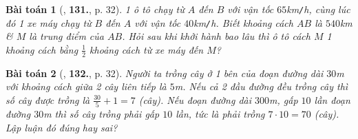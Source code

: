 \documentclass{article}
\numberwithin{equation}{section}
\newtheorem{baitoan}{Bài toán}
\begin{document}
\begin{baitoan}[\cite{Tuyen_Toan_7}, \textbf{131.}, p. 32]
	1 ô tô chạy từ $A$ đến $B$ với vận tốc $65$\emph{km\texttt{/}h}, cùng lúc đó 1 xe máy chạy từ $B$ đến $A$ với vận tốc $40$\emph{km\texttt{/}h}. Biết khoảng cách $AB$ là $540$\emph{km} \& $M$ là trung điểm của $AB$. Hỏi sau khi khởi hành bao lâu thì ô tô cách $M$ 1 khoảng cách bằng $\frac{1}{2}$ khoảng cách từ xe máy đến $M$?
\end{baitoan}

\begin{baitoan}[\cite{Tuyen_Toan_7}, \textbf{132.}, p. 32]
	Người ta trồng cây ở 1 bên của đoạn đường dài $30$\emph{m} với khoảng cách giữa 2 cây liên tiếp là $5$\emph{m}. Nếu cả 2 đầu đường đều trồng cây thì số cây được trồng là $\frac{30}{5} + 1 = 7$ (cây). Nếu đoạn đường dài $300$\emph{m}, gấp $10$ lần đoạn đường $30$\emph{m} thì số cây trồng phải gấp $10$ lần, tức là phải trồng $7\cdot 10 = 70$ (cây). Lập luận đó đúng hay sai?
\end{baitoan}

\end{document}
